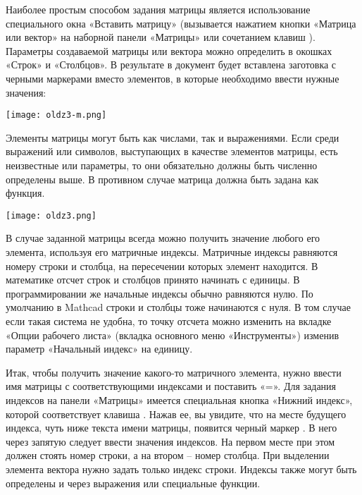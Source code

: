 Наиболее простым способом задания матрицы является использование специального окна «Вставить матрицу» (вызывается нажатием кнопки «Матрица или вектор» на наборной панели «Матрицы» или сочетанием клавиш ). Параметры создаваемой матрицы или вектора можно определить в окошках «Строк» и «Столбцов». В результате в документ будет вставлена заготовка с черными маркерами вместо элементов, в которые необходимо ввести нужные значения:

\begin{center}
	\texttt{[image: oldz3-m.png]}
\end{center}


Элементы матрицы могут быть как числами, так и выражениями. Если среди выражений или символов, выступающих в качестве элементов матрицы, есть неизвестные или параметры, то они обязательно должны быть численно определены выше. В противном случае матрица должна быть задана как функция.


\begin{center}
	\texttt{[image: oldz3.png]}
\end{center}


В случае заданной матрицы всегда можно получить значение любого его элемента, используя его матричные индексы. Матричные индексы равняются номеру строки и столбца, на пересечении которых элемент находится. В математике отсчет строк и столбцов принято начинать с единицы. В программировании же начальные индексы обычно равняются нулю. По умолчанию в Mathcad строки и столбцы тоже начинаются с нуля. В том случае если такая система не удобна, то точку отсчета можно изменить на вкладке «Опции рабочего листа» (вкладка основного меню «Инструменты») изменив параметр «Начальный индекс» на единицу.

Итак, чтобы получить значение какого-то матричного элемента, нужно ввести имя матрицы с соответствующими индексами и поставить «=». Для задания индексов на панели «Матрицы» имеется специальная кнопка «Нижний индекс», которой соответствует клавиша \keys{[} . Нажав ее, вы увидите, что на месте будущего индекса, чуть ниже текста имени матрицы, появится черный маркер . В него через запятую следует ввести значения индексов. На первом месте при этом должен стоять номер строки, а на втором – номер столбца. При выделении элемента вектора нужно задать только индекс строки. Индексы также могут быть определены и через выражения или специальные функции.


